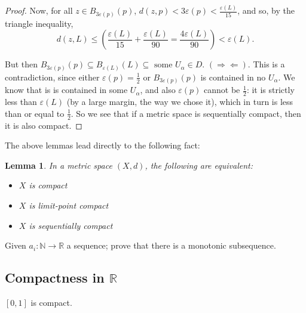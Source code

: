 \documentclass[12pt]{report}
\newcommand{\exercise}{ \noindent{\sc Exercise }\hspace{5pt} }
\newcommand{\claim}{ \noindent{\sc Claim }\hspace{5pt} }
\newcommand{\contra}{$(\Rightarrow\Leftarrow)$}
\newcommand{\reals}{\mathbb{R}}
\newcommand{\naturals}{\mathbb{N}}
\newcommand{\ball}[1]{B_{#1}}
\newtheorem{lemma}[theorem]{Lemma}
\begin{document}
\begin{proof}
Now, for all $z \in \ball{3\varepsilon(p)}(p)$, $d(z, p) < 3\varepsilon(p) <
\frac{\varepsilon(L)}{15}$, and so, by the triangle inequality, 
\begin{displaymath}
d(z,L) \leq (\frac{\varepsilon(L)}{15} + \frac{\varepsilon(L)}{90} =
\frac{4\varepsilon(L)}{90}) < \varepsilon(L).
\end{displaymath}

But then $\ball{3\varepsilon(p)}(p) \subseteq \ball{\varepsilon(L)}(L) \subseteq
\textrm{ some } U_\alpha \in D$. \contra. This is a contradiction, since
either $\varepsilon(p) = \frac{1}{2}$ or
$\ball{3\varepsilon(p)}(p)$ is contained in no $U_\alpha$. We know that is
is contained in some $U_\alpha$, and also
$\varepsilon(p)$ cannot be $\frac{1}{2}$: it is strictly less than
$\varepsilon(L)$ (by a large margin, the way we chose it), which in turn is
less than or equal to $\frac{1}{2}$. So we see that if a metric space is
sequentially compact, then it is also compact.
\end{proof}

The above lemmas lead directly to the following fact:
\begin{lemma}
\label{scicislc}
In a metric space $(X,d)$, the following are equivalent:
\begin{itemize}
\item[$i.$] $X$ is compact
\item[$i.$] $X$ is limit-point compact
\item[$ii.$] $X$ is sequentially compact
\end{itemize}
\end{lemma}

\exercise Given $a_i:\naturals \rightarrow \reals$ a sequence; prove that
there is a monotonic subsequence.\\

\subsection{Compactness in $\reals$}

\claim $[0,1]$ is compact.\\
\end{document}
